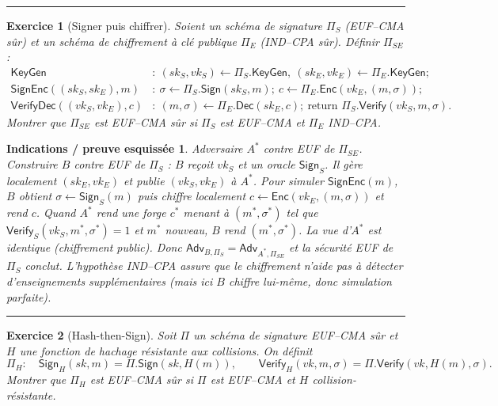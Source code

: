 \documentclass[11pt,a4paper]{article}
\newtheorem{exo}{Exercice}
\newtheorem*{sol}{Indications / preuve esquissée}
\newcommand{\Adv}{\mathsf{Adv}}
\newcommand{\KeyGen}{\mathsf{KeyGen}}
\newcommand{\Sign}{\mathsf{Sign}}
\newcommand{\Verify}{\mathsf{Verify}}
\newcommand{\Enc}{\mathsf{Enc}}
\newcommand{\Dec}{\mathsf{Dec}}
\begin{document}
\vspace{1ex}\hrule\vspace{1ex}

\begin{exo}[Signer puis chiffrer]
Soient un sch\'ema de signature $\Pi_S$ (EUF--CMA s\^ur) et un sch\'ema de chiffrement \`a cl\'e publique $\Pi_E$ (IND--CPA s\^ur). D\'efinir $\Pi_{SE}$ :
\begin{align*}
\KeyGen &:~ (sk_S,vk_S)\leftarrow \Pi_S.\KeyGen,\ (sk_E,vk_E)\leftarrow \Pi_E.\KeyGen;\\
\textsf{SignEnc}((sk_S,sk_E),m) &:~ \sigma\leftarrow \Pi_S.\Sign(sk_S,m);~ c\leftarrow \Pi_E.\Enc(vk_E,(m,\sigma));\\
\textsf{VerifyDec}((vk_S,vk_E),c) &:~ (m,\sigma)\leftarrow \Pi_E.\Dec(sk_E,c);\ \text{return } \Pi_S.\Verify(vk_S,m,\sigma).
\end{align*}
Montrer que $\Pi_{SE}$ est EUF--CMA s\^ur si $\Pi_S$ est EUF--CMA et $\Pi_E$ IND--CPA.
\end{exo}

\begin{sol}
Adversaire $A^\ast$ contre EUF de $\Pi_{SE}$. Construire $B$ contre EUF de $\Pi_S$ : $B$ re\c{c}oit $vk_S$ et un oracle $\Sign_S$. Il g\`ere localement $(sk_E,vk_E)$ et publie $(vk_S,vk_E)$ \`a $A^\ast$. Pour simuler $\textsf{SignEnc}(m)$, $B$ obtient $\sigma\leftarrow \Sign_S(m)$ puis chiffre localement $c\leftarrow \Enc(vk_E,(m,\sigma))$ et rend $c$. Quand $A^\ast$ rend une forge $c^\ast$ menant \`a $(m^\ast,\sigma^\ast)$ tel que $\Verify_S(vk_S,m^\ast,\sigma^\ast)=1$ et $m^\ast$ nouveau, $B$ rend $(m^\ast,\sigma^\ast)$. La vue d'$A^\ast$ est identique (chiffrement public). Donc $\Adv_{B,\Pi_S}=\Adv_{A^\ast,\Pi_{SE}}$ et la s\'ecurit\'e EUF de $\Pi_S$ conclut. L'hypoth\`ese IND--CPA assure que le chiffrement n'aide pas \`a d\'etecter d'enseignements suppl\'ementaires (mais ici $B$ chiffre lui-m\^eme, donc simulation parfaite).
\end{sol}

\vspace{1ex}\hrule\vspace{1ex}

\begin{exo}[Hash-then-Sign]
Soit $\Pi$ un sch\'ema de signature EUF--CMA s\^ur et $H$ une fonction de hachage r\'esistante aux collisions. On d\'efinit
\[
\Pi_H:\quad \Sign_H(sk,m)=\Pi.\Sign(sk,H(m)),\qquad
\Verify_H(vk,m,\sigma)=\Pi.\Verify(vk,H(m),\sigma).
\]
Montrer que $\Pi_H$ est EUF--CMA s\^ur si $\Pi$ est EUF--CMA et $H$ collision-r\'esistante.
\end{exo}
\end{document}
